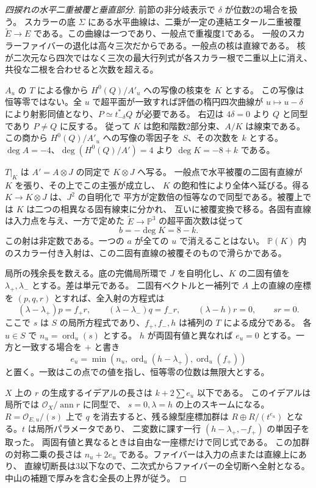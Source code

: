 \begin{proof}[四捩れの水平二重被覆と垂直部分]
前節の非分岐表示で $\delta$ が位数2の場合を扱う。
スカラーの底 $\Sigma$ にある水平曲線は、二乗が一定の連結エタール二重被覆
$\widetilde E\to E$ である。この曲線は一つであり、一般点で重複度1である。
一般のスカラーファイバーの退化は高々三次だからである。一般点の核は直線である。
核が二次元なら四次ではなく三次の最大行列式が各スカラー根で二重以上に消え、
共役な二根を合わせると次数を超える。

$A_u$ の $T$ による像から $H^0(Q)/A'_u$ への写像の核束を $K$ とする。
この写像は恒等零ではない。全 $u$ で超平面が一致すれば評価の楕円四次曲線が
$u\mapsto u-\delta$ により射影同値となり、$P\simeq t_{-\delta}^*Q$ が必要である。
右辺は $4\delta=0$ より $Q$ と同型であり $P\ne Q$ に反する。
従って $K$ は飽和階数2部分束、$A/K$ は線束である。この商から
$H^0(Q)/A'_u$ への写像の零因子を $S$、その次数を $k$ とする。
$\deg A=-4$、$\deg(H^0(Q)/A')=4$ より $\deg K=-8+k$ である。

$T|_K$ は $A'=A\otimes J$ の同定で $K\otimes J$ へ写る。
一般点で水平被覆の二固有直線が $K$ を張り、その上でこの主張が成立し、
$K$ の飽和性により全体へ延びる。得る $K\to K\otimes J$ は、$J^2$ の自明化で
平方が定数倍の恒等なので同型である。被覆上では $K$ は二つの相異なる固有線束に分かれ、
互いに被覆変換で移る。各固有直線は入力点を与え、一方で定めた
$\widetilde E\to\mathbb P^3$ の超平面次数は従って
\[
                      b=-\deg K=8-k .
\]
この射は非定数である。一つの $a$ が全ての $u$ で消えることはない。
$\mathbb P(K)$ 内のスカラー付き入射は、この二固有直線の被覆そのもので滑らかである。

局所の残余長を数える。底の完備局所環で $J$ を自明化し、$K$ の二固有値を
$\lambda_+,\lambda_-$ とする。差は単元である。
二固有ベクトルと一補列で $A$ 上の直線の座標を $(p,q,r)$ とすれば、全入射の方程式は
\[
 (\lambda-\lambda_+)p=f_+r,\qquad(\lambda-\lambda_-)q=f_-r,\qquad
 (\lambda-h)r=0,\qquad sr=0 .
\]
ここで $s$ は $S$ の局所方程式であり、$f_+,f_-,h$ は補列の $T$ による成分である。
各 $u\in S$ で $n_u=\operatorname{ord}_u(s)$ とする。
$h$ が両固有値と異なれば $e_u=0$ とする。一方と一致する場合を $+$ と書き
\[
        e_u=\min(n_u,\operatorname{ord}_u(h-\lambda_+),
                        \operatorname{ord}_u(f_+))
\]
と置く。一致はこの点での値を指し、恒等零の位数は無限大とする。

$X$ 上の $r$ の生成するイデアルの長さは $k+2\sum e_u$ 以下である。
このイデアルは局所では $\mathcal O_X/\operatorname{ann}r$ に同型で、
$s=0,\lambda=h$ の上のスキームになる。$R=\mathcal O_{E,u}/(s)$ 上で
$q$ を消去すると、残る線型座標加群は
$R\oplus R/(t^{e_u})$ となる。$t$ は局所パラメータであり、
二変数に課す一行 $(h-\lambda_+,-f_+)$ の単因子を取った。
両固有値と異なるときは自由な一座標だけで同じ式である。
この加群の対称二乗の長さは $n_u+2e_u$ である。ファイバーは入力の点または直線上にあり、
直線切断長は3以下なので、二次式からファイバーの全切断へ全射となる。
中山の補題で厚みを含む全長の上界が従う。


\end{proof}
